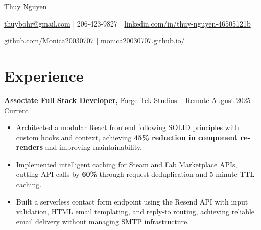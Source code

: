 \documentclass[11pt]{article}       %
\begin{document}
\centerline{\Huge Thuy Nguyen}

\vspace{5pt}

\centerline{\href{mailto:thuybohr@gmail.com}{thuybohr@gmail.com} | 206-423-9827 |
\href{https://www.linkedin.com/in/thuy-nguyen-46505121b/}{linkedin.com/in/thuy-nguyen-46505121b}}

\centerline{\href{https://github.com/Monica20030707}{github.com/Monica20030707} |
\href{https://monica20030707.github.io/}{monica20030707.github.io/}}

\vspace{-9pt}

\section*{Experience}

\textbf{Associate Full Stack Developer,} {Forge Tek Studios} -- Remote \hfill August 2025 -- Current
\vspace{-9pt}
\begin{itemize}
  \item Architected a modular React frontend following SOLID principles with custom hooks and context, achieving \textbf{45\% reduction in component re-renders} and improving maintainability.
  \item Implemented intelligent caching for Steam and Fab Marketplace APIs, cutting API calls by \textbf{60\%} through request deduplication and 5-minute TTL caching.
  \item Built a serverless contact form endpoint using the Resend API with input validation, HTML email templating, and reply-to routing, achieving reliable email delivery without managing SMTP infrastructure.
\end{itemize}
\end{document}
